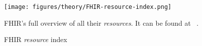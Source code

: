 \begin{figure}[H]
    \centering
    \texttt{[image: figures/theory/FHIR-resource-index.png]}
    \caption{FHIR \emph{resource} index}
    \medskip
    \small
    \raggedright
    FHIR's full overview of all their \emph{resources}. It can be found at ~\cite{FHIR-resource-index}.
    \label{fig:FHIR-resource-index}
\end{figure}
